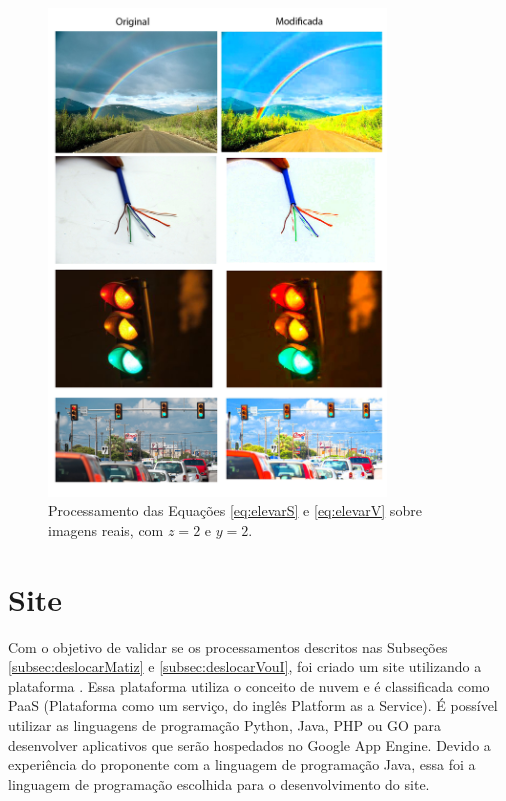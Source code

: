 \documentclass[	12pt, Times, openright, twoside, a4paper, english, brazil]{abntex2}
\begin{document}
\begin{figure}[!htb]
\centering \includegraphics[width=0.80\textwidth]{figuraRealSeV.jpg}
\caption{Processamento das Equações \ref{eq:elevarS} e \ref{eq:elevarV} sobre imagens reais, com $z = 2$ e $y = 2$. \label{fig:figuraRealVeS}}
\end{figure}

\section{Site}

Com o objetivo de validar se os processamentos descritos nas Subseções \ref{subsec:deslocarMatiz} e \ref{subsec:deslocarVouI}, foi criado um site utilizando a plataforma . Essa plataforma utiliza o conceito de nuvem e é classificada como PaaS (Plataforma como um serviço, do inglês Platform as a Service). É possível utilizar as linguagens de programação Python, Java, PHP ou GO para desenvolver aplicativos que serão hospedados no Google App Engine. Devido a experiência do proponente com a linguagem de programação Java, essa foi a linguagem de programação escolhida para o desenvolvimento do site. 
\end{document}
